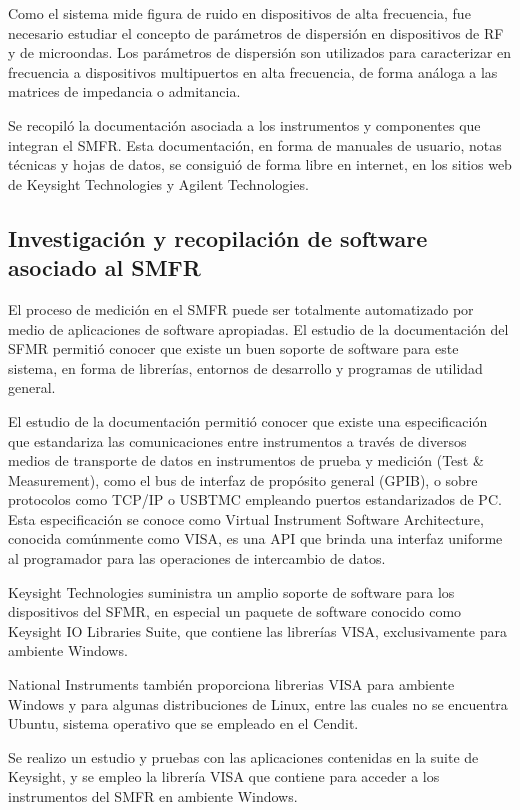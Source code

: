 \documentclass[paper=letter,oneside,fontsize=12pt, parskip=full]{article}
\begin{document}
	Como el sistema mide figura de ruido en dispositivos de alta frecuencia, fue necesario estudiar el concepto de parámetros de dispersión en dispositivos de RF y de microondas. Los parámetros de dispersión son utilizados para caracterizar en frecuencia a dispositivos multipuertos en alta frecuencia, de forma análoga a las matrices de impedancia o admitancia.
	
	Se recopiló la documentación asociada a los instrumentos y componentes que integran el SMFR. Esta documentación, en forma de manuales de usuario, notas técnicas y hojas de datos, se consiguió de forma libre en internet, en los sitios web de Keysight Technologies y Agilent Technologies. 	
	
	\subsection{Investigación y recopilación de software asociado al SMFR}
	
	El proceso de medición en el SMFR puede ser totalmente automatizado por medio de aplicaciones de software apropiadas. El estudio de la documentación del SFMR permitió conocer que existe un buen soporte de software para este sistema, en forma de librerías, entornos de desarrollo y programas de utilidad general.
	
	El estudio de la documentación permitió conocer que existe una especificación que estandariza las comunicaciones entre instrumentos a través de diversos medios de transporte de datos en instrumentos de prueba y medición (Test \& Measurement), como  el bus de interfaz de propósito general (GPIB), o sobre protocolos como TCP/IP o USBTMC empleando puertos estandarizados de PC. Esta especificación se conoce como Virtual Instrument Software Architecture, conocida comúnmente como VISA, es una API que brinda una interfaz uniforme al programador para las operaciones de intercambio de datos. 
	
	Keysight Technologies suministra un amplio soporte de software para los dispositivos del SFMR, en especial un paquete de software conocido como Keysight IO Libraries Suite, que contiene las librerías VISA, exclusivamente para ambiente Windows. 
	
	National Instruments también proporciona librerias VISA para ambiente Windows y para algunas distribuciones de Linux, entre las cuales no se encuentra Ubuntu, 
	sistema operativo que se empleado en el Cendit.
	
	Se realizo un estudio y pruebas con las aplicaciones contenidas en la suite de Keysight, y se empleo la librería VISA que contiene para acceder a los instrumentos del SMFR en ambiente Windows.
	
\end{document}
